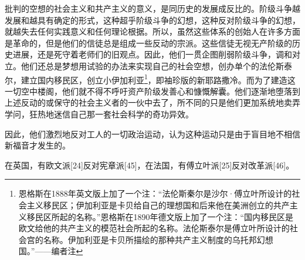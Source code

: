 \documentclass[UTF8,zihao=-4,a4paper]{ctexart}
\begin{document}
批判的空想的社会主义和共产主义的意义，是同历史的发展成反比的。阶级斗争越发展和越具有确定的形式，这种超乎阶级斗争的幻想，这种反对阶级斗争的幻想，就越失去任何实践意义和任何理论根据。所以，虽然这些体系的创始人在许多方面是革命的，但是他们的信徒总是组成一些反动的宗派。这些信徒无视无产阶级的历史进展，还是死守着老师们的旧观点。因此，他们一贯企图削弱阶级斗争，调和对立。他们还总是梦想用试验的办法来实现自己的社会空想，创办单个的法伦斯泰尔，建立国内移民区，创立小伊加利亚\footnote{恩格斯在1888年英文版上加了一个注：“法伦斯秦尔是沙尔·傅立叶所设计的社会主义移民区；伊加利亚是卡贝给自己的理想国和后来他在美洲创立的共产主义移民区所起的名称。”恩格斯在1890年德文版上加了一个注：“国内移民区是欧文给他的共产主义的模范社会所起的名称。法伦斯泰尔是傅立叶所设计的社会宫的名称。伊加利亚是卡贝所描绘的那种共产主义制度的乌托邦幻想国。”——编者注}，即袖珍版的新耶路撒冷。而为了建造这一切空中楼阁，他们就不得不呼吁资产阶级发善心和慷慨解囊。他们逐渐地堕落到上述反动的或保守的社会主义者的一伙中去了，所不同的只是他们更加系统地卖弄学问，狂热地迷信自己那一套社会科学的奇功异效。\par
因此，他们激烈地反对工人的一切政治运动，认为这种运动只是由于盲目地不相信新福音才发生的。\par
在英国，有欧文派[24]反对宪章派[45]，在法国，有傅立叶派[25]反对改革派[46]。\par
\end{document}

